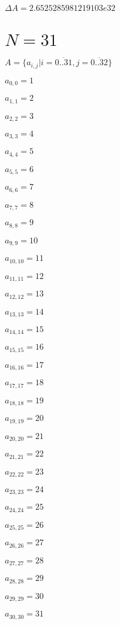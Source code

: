 \documentclass[a4paper,12pt]{article}
\begin{document}
$\Delta A = 2.6525285981219103e32$



\section{ $N = 31$ }
$A = \{ a _{ i, j } | i = \overline { 0..31 }, j = \overline { 0..32 } \}$

$a _{ 0, 0 } = 1$

$a _{ 1, 1 } = 2$

$a _{ 2, 2 } = 3$

$a _{ 3, 3 } = 4$

$a _{ 4, 4 } = 5$

$a _{ 5, 5 } = 6$

$a _{ 6, 6 } = 7$

$a _{ 7, 7 } = 8$

$a _{ 8, 8 } = 9$

$a _{ 9, 9 } = 10$

$a _{ 10, 10 } = 11$

$a _{ 11, 11 } = 12$

$a _{ 12, 12 } = 13$

$a _{ 13, 13 } = 14$

$a _{ 14, 14 } = 15$

$a _{ 15, 15 } = 16$

$a _{ 16, 16 } = 17$

$a _{ 17, 17 } = 18$

$a _{ 18, 18 } = 19$

$a _{ 19, 19 } = 20$

$a _{ 20, 20 } = 21$

$a _{ 21, 21 } = 22$

$a _{ 22, 22 } = 23$

$a _{ 23, 23 } = 24$

$a _{ 24, 24 } = 25$

$a _{ 25, 25 } = 26$

$a _{ 26, 26 } = 27$

$a _{ 27, 27 } = 28$

$a _{ 28, 28 } = 29$

$a _{ 29, 29 } = 30$

$a _{ 30, 30 } = 31$
\end{document}
